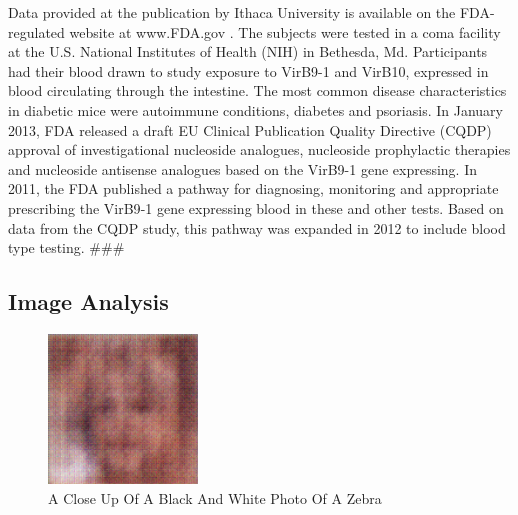 \documentclass{article}%
\begin{document}
Data provided at the publication by Ithaca University is available on the FDA{-}regulated website at www.FDA.gov . The subjects were tested in a coma facility at the U.S. National Institutes of Health (NIH) in Bethesda, Md. Participants had their blood drawn to study exposure to VirB9{-}1 and VirB10, expressed in blood circulating through the intestine. The most common disease characteristics in diabetic mice were autoimmune conditions, diabetes and psoriasis.\newline%
In January 2013, FDA released a draft EU Clinical Publication Quality Directive (CQDP) approval of investigational nucleoside analogues, nucleoside prophylactic therapies and nucleoside antisense analogues based on the VirB9{-}1 gene expressing.\newline%
In 2011, the FDA published a pathway for diagnosing, monitoring and appropriate prescribing the VirB9{-}1 gene expressing blood in these and other tests. Based on data from the CQDP study, this pathway was expanded in 2012 to include blood type testing.\newline%
\#\#\#

%
\subsection{Image Analysis}%
\label{subsec:ImageAnalysis}%


\begin{figure}[h!]%
\centering%
\includegraphics[width=150px]{500_fake_images/samples_5_355.png}%
\caption{A Close Up Of A Black And White Photo Of A Zebra}%
\end{figure}

%
\end{document}
